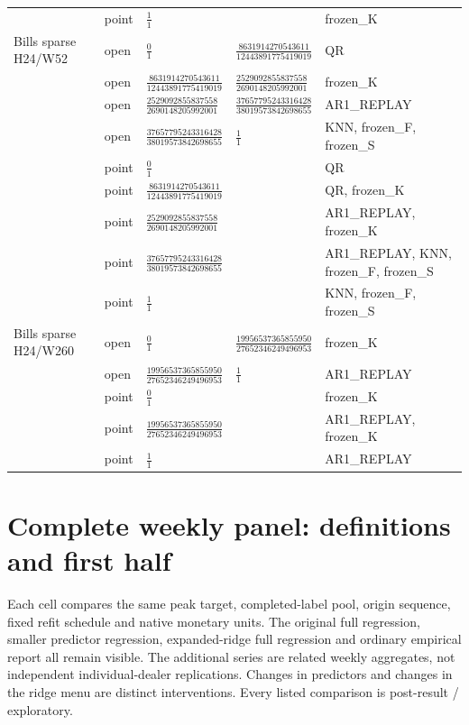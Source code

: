 \documentclass[11pt,a4paper]{article}
\begin{document}
\begin{longtable}{p{28mm}p{10mm}p{39mm}p{39mm}p{28mm}}
 & point & \(\frac{1}{1}\) &  & frozen\_K \\
Bills sparse H24/W52 & open & \(\frac{0}{1}\) & \(\frac{8631914270543611}{12443891775419019}\) & QR \\
 & open & \(\frac{8631914270543611}{12443891775419019}\) & \(\frac{2529092855837558}{2690148205992001}\) & frozen\_K \\
 & open & \(\frac{2529092855837558}{2690148205992001}\) & \(\frac{37657795243316428}{38019573842698655}\) & AR1\_REPLAY \\
 & open & \(\frac{37657795243316428}{38019573842698655}\) & \(\frac{1}{1}\) & KNN, frozen\_F, frozen\_S \\
 & point & \(\frac{0}{1}\) &  & QR \\
 & point & \(\frac{8631914270543611}{12443891775419019}\) &  & QR, frozen\_K \\
 & point & \(\frac{2529092855837558}{2690148205992001}\) &  & AR1\_REPLAY, frozen\_K \\
 & point & \(\frac{37657795243316428}{38019573842698655}\) &  & AR1\_REPLAY, KNN, frozen\_F, frozen\_S \\
 & point & \(\frac{1}{1}\) &  & KNN, frozen\_F, frozen\_S \\
Bills sparse H24/W260 & open & \(\frac{0}{1}\) & \(\frac{19956537365855950}{27652346249496953}\) & frozen\_K \\
 & open & \(\frac{19956537365855950}{27652346249496953}\) & \(\frac{1}{1}\) & AR1\_REPLAY \\
 & point & \(\frac{0}{1}\) &  & frozen\_K \\
 & point & \(\frac{19956537365855950}{27652346249496953}\) &  & AR1\_REPLAY, frozen\_K \\
 & point & \(\frac{1}{1}\) &  & AR1\_REPLAY \\
\end{longtable}
\endgroup

\section{Complete weekly panel: definitions and first half}\label{sup:panel}

Each cell compares the same peak target, completed-label pool,
origin sequence, fixed refit schedule and native monetary units. The original
full regression, smaller predictor regression, expanded-ridge full regression
and ordinary empirical report all remain visible. The additional series are
related weekly aggregates, not independent individual-dealer replications.
Changes in predictors and changes in the ridge menu are distinct interventions.
Every listed comparison is post-result / exploratory.
\end{document}
